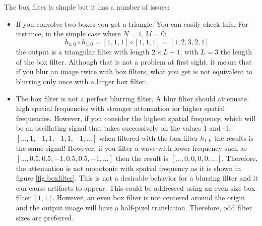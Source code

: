 The box filter is simple but it has a number of issues:
\begin{itemize}
\item {If you convolve two boxes you get a triangle. You can easily check this. For instance, in the simple case where $N=1, M=0$:
\begin{equation}
h_{1,0}  \circ h_{1,0} = \left[1, 1, 1\right] \circ \left[1, 1, 1\right] = \left[1,2,3,2,1\right]
\end{equation}
the output  is a triangular filter with length $2\times L-1$, with $L=3$ the length of the box filter. Although that is not a problem at first sight, it means that if you blur an image twice with box filters, what you get is not equivalent to blurring only once with a larger box filter. }

\item {The box filter is not a perfect blurring filter. A blur filter should attenuate high spatial frequencies with stronger attenuation for higher spatial frequencies. However, if you consider the highest spatial frequency, which will be an oscillating signal that takes successively on the values 1 and -1: $\left[..., 1, -1, 1, -1, 1, -1, ... \right]$ when filtered with the box filter $h_{1,0}$ the results is the same signal! However, if you filter a wave with lower frequency such as $\left[..., 0.5, 0.5, -1, 0.5, 0.5, -1, ... \right]$ then the result is $\left[..., 0,0,0,0, ...\right]$. Therefore, the attenuation is not monotonic with spatial frequency as it is shown in figure \ref{fig:boxfilter}. This is not a desirable behavior for a blurring filter and it can cause artifacts to appear. This could be addressed using an even size box filter $\left[1,1 \right]$. However, an even box filter is not centered around the origin and the output image will have a half-pixel translation. Therefore, odd filter sizes are preferred.}
\end{itemize}


